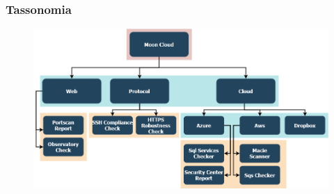 
\begin{frame}
    \frametitle{Tassonomia}
    \begin{figure}
        \centering
        \includegraphics[scale=0.35]{images/MC_Rec_Tree2}
    \end{figure}
\end{frame}

